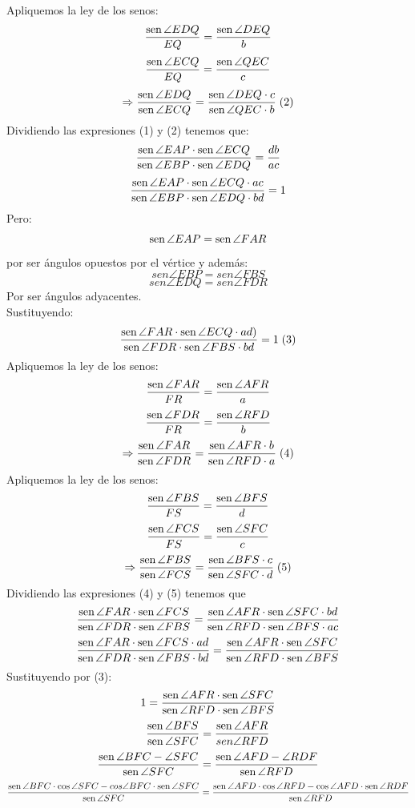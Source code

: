 \documentclass{book}
\newcommand{\sen}{\mathop{\rm sen}\nolimits} %
\begin{document}
\begin{enumerate}
          Apliquemos la ley de los senos:
          $${\sen {\angle EDQ}\over EQ}={\sen {\angle DEQ}\over b}$$
          $${\sen {\angle ECQ}\over EQ}={\sen {\angle QEC}\over c}$$
          $$\Rightarrow{\sen {\angle EDQ}\over\sen {\angle ECQ}}={\sen {\angle DEQ}\cdot c\over\sen {\angle QEC}\cdot b}\;  (2)$$
          Dividiendo las expresiones (1) y (2) tenemos que:
          $$\frac{\sen {\angle EAP}\cdot\sen {\angle ECQ}}{\sen {\angle EBP}\cdot\sen {\angle EDQ}}={db\over ac}  $$
          $$\frac{\sen {\angle EAP}\cdot\sen {\angle ECQ}\cdot ac}{\sen {\angle EBP}\cdot\sen {\angle EDQ}\cdot bd}=1$$
          Pero:
          $$\sen {\angle EAP}=\sen {\angle FAR}$$
          por ser ángulos opuestos por el vértice y además:
          $$sen {\angle EBP}=sen {\angle FBS}$$
          $$sen {\angle EDQ}=sen {\angle FDR}$$
          Por ser ángulos adyacentes.\\
          Sustituyendo:
          $$\frac{\sen {\angle FAR}\cdot\sen {\angle ECQ}\cdot ad)}{\sen {\angle FDR}\cdot\sen {\angle FBS}\cdot bd}=1\; (3)$$
          Apliquemos la ley de los senos:
          $${\sen {\angle FAR}\over FR}={\sen {\angle AFR}\over a}$$
          $${\sen {\angle FDR}\over FR}={\sen {\angle RFD}\over b}$$
          $$\Rightarrow\frac{\sen {\angle FAR}}{\sen {\angle FDR}}=\frac{\sen {\angle AFR}\cdot b}{\sen {\angle RFD}\cdot a}\;(4)$$
          Apliquemos la ley de los senos:
          $${\sen {\angle FBS}\over FS}={\sen {\angle BFS}\over d}$$
          $${\sen {\angle FCS}\over FS}={\sen {\angle SFC}\over c}$$
          $$\Rightarrow\frac{\sen {\angle FBS}}{\sen {\angle FCS}}=\frac{\sen {\angle BFS}\cdot c}{\sen {\angle SFC}\cdot d}\;(5)$$
          Dividiendo las expresiones (4) y (5) tenemos que
          $$\frac{\sen {\angle FAR}\cdot\sen {\angle FCS}}{\sen {\angle FDR}\cdot\sen {\angle FBS}}=\frac{\sen {\angle AFR}\cdot\sen {\angle SFC}\cdot bd}{\sen {\angle RFD}\cdot\sen {\angle BFS}\cdot ac}$$
          $$\frac{\sen {\angle FAR}\cdot\sen {\angle FCS}\cdot ad}{\sen {\angle FDR}\cdot\sen {\angle FBS}\cdot bd}=\frac{\sen {\angle AFR}\cdot\sen {\angle SFC}}{\sen {\angle RFD}\cdot\sen {\angle BFS}}$$
          Sustituyendo por (3):
          $$1=\frac{\sen {\angle AFR}\cdot\sen {\angle SFC}}{\sen {\angle RFD}\cdot\sen {\angle BFS}}$$
          $$\frac{\sen {\angle BFS}}{\sen {\angle SFC}}=\frac{\sen {\angle AFR}}{
                  sen {\angle RFD}}$$
          $$\frac{\sen {\angle BFC-\angle SFC}}{\sen {\angle SFC}}=\frac{\sen {\angle AFD-\angle RDF}}{\sen {\angle RFD}}$$
          $$\frac{\sen{\angle BFC}\cdot\cos{\angle SFC}-cos{\angle BFC}\cdot\sen {\angle SFC}}{\sen{\angle SFC}}=\frac{\sen{\angle AFD}\cdot\cos{\angle RFD}-\cos{\angle AFD}\cdot\sen{\angle RDF}}{\sen{\angle RFD}}$$

\end{enumerate}
\end{document}
